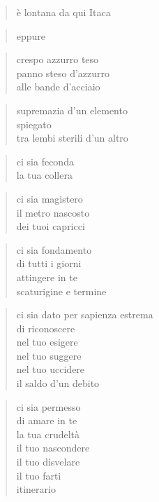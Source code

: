 	\begin{verse}
		è lontana da qui Itaca
	\end{verse}

	\begin{verse}
		eppure
	\end{verse}


\clearpage



	\begin{verse}
		crespo azzurro teso\\
		panno steso d’azzurro\\
		alle bande d’acciaio
	\end{verse}

	\begin{verse}
		supremazia d’un elemento\\
		spiegato\\
		tra lembi sterili d’un altro
	\end{verse}

	\begin{verse}
		ci sia feconda\\
		la tua collera
	\end{verse}

	\begin{verse}
		ci sia magistero\\
		il metro nascosto\\
		dei tuoi capricci
	\end{verse}

	\begin{verse}
		ci sia fondamento\\
		di tutti i giorni\\
		attingere in te\\
		scaturigine e termine
	\end{verse}

	\begin{verse}
		ci sia dato
		per sapienza estrema\\
		di riconoscere\\
		nel tuo esigere\\
		nel tuo suggere\\
		nel tuo uccidere\\
		il saldo d’un debito
	\end{verse}

	\begin{verse}
		ci sia permesso\\
		di amare in te\\
		la tua crudeltà\\
		il tuo nascondere\\
		il tuo disvelare\\
		il tuo farti\\
		itinerario
	\end{verse}


